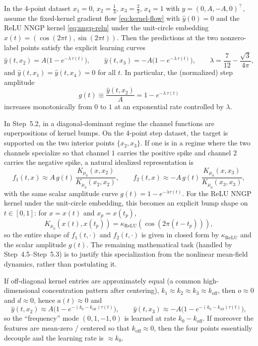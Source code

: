 \begin{lemma}\label{lem:4pt-step-curve}
In the 4-point dataset $x_1=0$, $x_2=\tfrac13$, $x_3=\tfrac23$, $x_4=1$ with $y=(0,A,-A,0)^\top$, assume the fixed-kernel gradient flow \eqref{eq:kernel-flow} with $\hat y(0)=0$ and the ReLU NNGP kernel \eqref{eq:nngp-relu} under the unit-circle embedding $x(t)=(\cos(2\pi t),\sin(2\pi t))$.
Then the predictions at the two nonzero-label points satisfy the explicit learning curves
\[
\hat y(t,x_2)=A\Big(1-e^{-\lambda\,\tau(t)}\Big),\qquad
\hat y(t,x_3)=-A\Big(1-e^{-\lambda\,\tau(t)}\Big),
\qquad
\lambda=\frac{7}{12}-\frac{\sqrt{3}}{4\pi},
\]
and $\hat y(t,x_1)=\hat y(t,x_4)=0$ for all $t$.
In particular, the (normalized) step amplitude
\[
g(t)\equiv \frac{\hat y(t,x_2)}{A}=1-e^{-\lambda\,\tau(t)}
\]
increases monotonically from $0$ to $1$ at an exponential rate controlled by $\lambda$.
\end{lemma}

\begin{remark}
In Step~5.2, in a diagonal-dominant regime the channel functions are superpositions of kernel bumps.
On the 4-point step dataset, the target is supported on the two interior points $\{x_2,x_3\}$.
If one is in a regime where the two channels specialize so that channel $1$ carries the positive spike and channel $2$ carries the negative spike, a natural idealized representation is
\[
f_1(t,x)\approx A\,g(t)\,\frac{K_{\mu_0}(x,x_2)}{K_{\mu_0}(x_2,x_2)},\qquad
f_2(t,x)\approx -A\,g(t)\,\frac{K_{\mu_0}(x,x_3)}{K_{\mu_0}(x_3,x_3)},
\]
with the same scalar amplitude curve $g(t)=1-e^{-\lambda\tau(t)}$.
For the ReLU NNGP kernel under the unit-circle embedding, this becomes an explicit bump shape on $t\in[0,1]$:
for $x=x(t)$ and $x_p=x(t_p)$,
\[
K_{\mu_0}(x(t),x(t_p))=\kappa_{\mathrm{ReLU}}(\cos(2\pi(t-t_p))),
\]
so the entire shape of $f_1(t,\cdot)$ and $f_2(t,\cdot)$ is given in closed form by $\kappa_{\mathrm{ReLU}}$ and the scalar amplitude $g(t)$.
The remaining mathematical task (handled by Step~4.5--Step~5.3) is to justify this specialization from the nonlinear mean-field dynamics, rather than postulating it.
\end{remark}

\begin{remark}
If off-diagonal kernel entries are approximately equal (a common high-dimensional concentration pattern after centering), $k_1\approx k_2\approx k_3\approx k_{\mathrm{off}}$, then $o\approx 0$ and $d\approx 0$, hence $a(t)\approx 0$ and
\[
\hat y(t,x_2)\approx A\big(1-e^{-(k_0-k_{\mathrm{off}})\tau(t)}\big),\qquad \hat y(t,x_3)\approx -A\big(1-e^{-(k_0-k_{\mathrm{off}})\tau(t)}\big),
\]
so the ``frequency'' mode $(0,1,-1,0)$ is learned at rate $k_0-k_{\mathrm{off}}$.
If moreover the features are mean-zero / centered so that $k_{\mathrm{off}}\approx 0$, then the four points essentially decouple and the learning rate is $\approx k_0$.
\end{remark}

